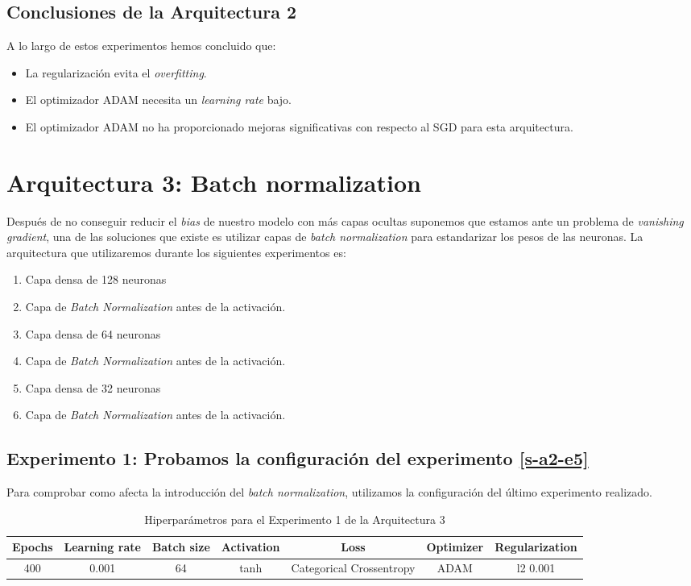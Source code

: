 \documentclass{article}
\begin{document}
		\subsection{Conclusiones de la Arquitectura 2}
			A lo largo de estos experimentos hemos concluido que:
			\begin{itemize}
				\item La regularizaci\'on evita el \textit{overfitting}.
				\item El optimizador ADAM necesita un \textit{learning rate} bajo.
				\item El optimizador ADAM no ha proporcionado mejoras significativas con respecto al SGD para esta arquitectura.
			\end{itemize}
			
	\section{Arquitectura 3: Batch normalization}
		Despu\'es de no conseguir reducir el \textit{bias} de nuestro modelo con m\'as capas ocultas suponemos que estamos ante un problema de \textit{vanishing gradient}, una de las soluciones que existe es utilizar capas de \textit{batch normalization} para estandarizar los pesos de las neuronas. La arquitectura que utilizaremos durante los siguientes experimentos es:
		\begin{enumerate}
			\item Capa densa de 128 neuronas
			\item Capa de \textit{Batch Normalization} antes de la activaci\'on.
			\item Capa densa de 64 neuronas
			\item Capa de \textit{Batch Normalization} antes de la activaci\'on.
			\item Capa densa de 32 neuronas
			\item Capa de \textit{Batch Normalization} antes de la activaci\'on.
		\end{enumerate}
		
		\subsection{Experimento 1: Probamos la configuraci\'on del experimento \ref{s-a2-e5}}
		\label{s-a3-e1}
			Para comprobar como afecta la introducci\'on del \textit{batch normalization}, utilizamos la configuraci\'on del \'ultimo experimento realizado.
			
			\begin{table}[!h]
				\begin{tabular}{| c | c | c | c | c | c | c |}
					\textbf{Epochs} & \textbf{Learning rate} & \textbf{Batch size} & \textbf{Activation} & \textbf{Loss} & \textbf{Optimizer} & \textbf{Regularization} \\ \hline
					400 & 0.001 & 64 & tanh & Categorical Crossentropy & ADAM & l2 0.001
				\end{tabular}
				\caption{Hiperpar\'ametros para el Experimento 1 de la Arquitectura 3}
				\label{tab:hip-a3-e1}
			\end{table}
			
\end{document}

